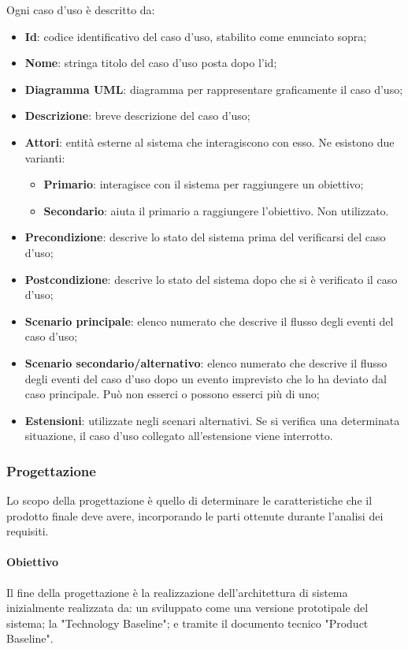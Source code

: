 Ogni caso d'uso è descritto da:
\begin{itemize}
\item \textbf{Id}: codice identificativo del caso d'uso, stabilito come enunciato sopra;
\item \textbf{Nome}: stringa titolo del caso d'uso posta dopo l'id;
\item \textbf{Diagramma UML}: diagramma per rappresentare graficamente il caso d'uso;
\item \textbf{Descrizione}: breve descrizione del caso d'uso;
\item \textbf{Attori}: entità esterne al sistema che interagiscono con esso. Ne esistono due varianti:
\begin{itemize}
\item \textbf{Primario}: interagisce con il sistema per raggiungere un obiettivo;
\item \textbf{Secondario}: aiuta il primario a raggiungere l'obiettivo. Non utilizzato.
\end{itemize}
\item \textbf{Precondizione}: descrive lo stato del sistema prima del verificarsi del caso d'uso;
\item \textbf{Postcondizione}: descrive lo stato del sistema dopo che si è verificato il caso d'uso;
\item \textbf{Scenario principale}: elenco numerato che descrive il flusso degli eventi del caso d'uso;
\item \textbf{Scenario secondario/alternativo}: elenco numerato che descrive il flusso degli eventi del caso d'uso dopo un evento imprevisto che lo ha deviato dal caso principale. Può non esserci o possono esserci più di uno;
\item \textbf{Estensioni}: utilizzate negli scenari alternativi. Se si verifica una determinata situazione, il caso d'uso collegato all'estensione viene interrotto.
\end{itemize}

\subsubsection{Progettazione}
Lo scopo della progettazione è quello di determinare le caratteristiche che il prodotto finale deve avere, incorporando le parti ottenute durante l'analisi dei requisiti.

\paragraph{Obiettivo}
Il fine della progettazione è la realizzazione dell'architettura di sistema inizialmente realizzata da: un \docNamePoC{}\glo{}  sviluppato come una versione prototipale del sistema; la  "Technology Baseline"; e tramite il documento tecnico  "Product Baseline".

